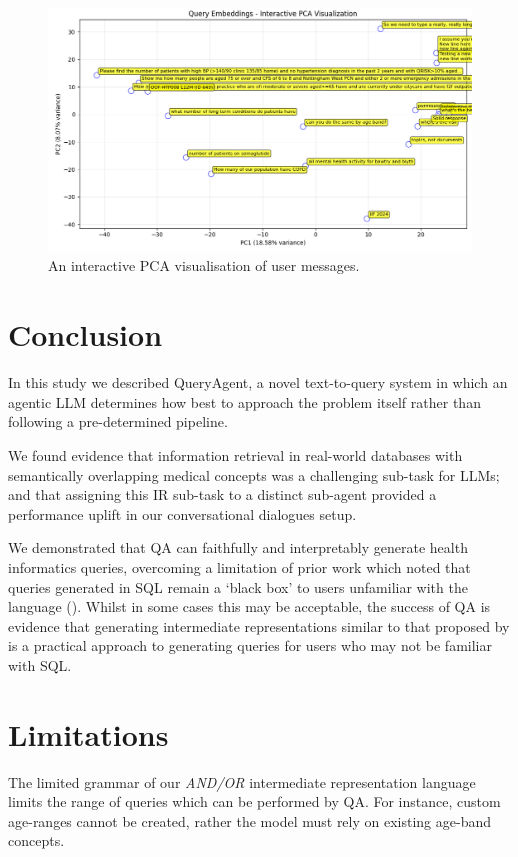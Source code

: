 \documentclass[11pt]{article}
\begin{document}
\begin{figure}[b]
  \includegraphics[width=\linewidth]{content/pca_09_16_randomly_sampled_20.png}
  \caption{
    An interactive PCA visualisation of user messages.
  }
  \label{fig:sample-user-utterances}
\end{figure}

\section{Conclusion}
In this study we described QueryAgent, a novel text-to-query system in which an agentic LLM determines how best to approach the problem itself rather than following a pre-determined pipeline.

We found evidence that information retrieval in real-world databases with semantically overlapping medical concepts was a challenging sub-task for LLMs; and that assigning this IR sub-task to a distinct sub-agent provided a performance uplift in our conversational dialogues setup.

We demonstrated that QA can faithfully and interpretably generate health informatics queries, overcoming a limitation of prior work which noted that queries generated in SQL remain a `black box' to users unfamiliar with the language  (\citet{ziletti_generating_2025}).
Whilst in some cases this may be acceptable, the success of QA is evidence that generating intermediate representations similar to that proposed by \citet{guo_towards_2019} is a practical approach to generating queries for users who may not be familiar with SQL.


\section{Limitations}
The limited grammar of our \textit{AND/OR} intermediate representation language limits the range of queries which can be performed by QA.
For instance, custom age-ranges cannot be created, rather the model must rely on existing age-band concepts.
\end{document}
